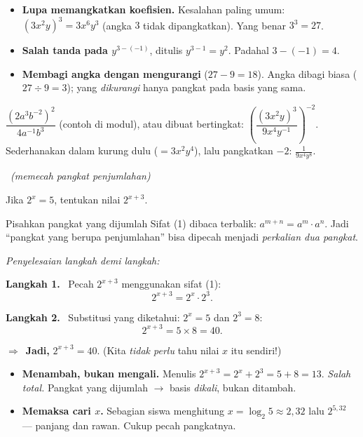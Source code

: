 \documentclass[11pt,a4paper]{report}
\theoremstyle{gaya}
\newcommand{\jawab}{\par\smallskip\noindent\textit{\textcolor{oranye}{Penyelesaian langkah demi langkah:}}\par\smallskip}
\newcommand{\langkah}[1]{\par\smallskip\noindent\textbf{\textcolor{biru}{Langkah #1.}}\ }
\newcommand{\jadi}{\par\smallskip\noindent$\Rightarrow$\ \textbf{Jadi, }}
\newcommand{\soalno}[2]{%
  \par\bigskip
  \noindent{\large\bfseries\color{ungu}\rule[-2pt]{4pt}{14pt}\ Soal #1}%
  \ {\normalfont\itshape\color{gray}(#2)}\par\nopagebreak\smallskip}
\begin{document}
\begin{jebakan}
\begin{itemize}[leftmargin=*,topsep=2pt]
  \item \textbf{Lupa memangkatkan koefisien.} Kesalahan paling umum:
  $(3x^2y)^3 = 3x^6y^3$ (angka $3$ tidak dipangkatkan). Yang benar $3^3=27$.
  \item \textbf{Salah tanda pada $y^{3-(-1)}$}, ditulis $y^{3-1}=y^2$. Padahal
  $3-(-1)=4$.
  \item \textbf{Membagi angka dengan mengurangi} ($27-9=18$). Angka dibagi biasa
  ($27\div9=3$); yang \emph{dikurangi} hanya pangkat pada basis yang sama.
\end{itemize}
\end{jebakan}

\begin{variasi}
$\dfrac{(2a^3b^{-2})^2}{4a^{-1}b^3}$ (contoh di modul), atau dibuat
bertingkat: $\left(\dfrac{(3x^2y)^3}{9x^4y^{-1}}\right)^{-2}$. Sederhanakan
dalam kurung dulu ($=3x^2y^4$), lalu pangkatkan $-2$: $\frac{1}{9x^4y^8}$.
\end{variasi}

\soalno{1.1.5}{memecah pangkat penjumlahan}
\begin{soalbox}{}
Jika $2^x = 5$, tentukan nilai $2^{x+3}$.
\end{soalbox}

\begin{ingat}{Pisahkan pangkat yang dijumlah}
Sifat (1) dibaca terbalik: $a^{m+n} = a^m\cdot a^n$. Jadi ``pangkat yang berupa
penjumlahan'' bisa dipecah menjadi \emph{perkalian dua pangkat}.
\end{ingat}

\jawab
\langkah{1} Pecah $2^{x+3}$ menggunakan sifat (1):
\[
2^{x+3} = 2^{x}\cdot 2^{3}.
\]
\langkah{2} Substitusi yang diketahui: $2^x = 5$ dan $2^3=8$:
\[
2^{x+3} = 5\times 8 = 40.
\]
\jadi $2^{x+3} = 40$. (Kita \emph{tidak perlu} tahu nilai $x$ itu sendiri!)

\begin{jebakan}
\begin{itemize}[leftmargin=*,topsep=2pt]
  \item \textbf{Menambah, bukan mengali.} Menulis $2^{x+3}=2^x + 2^3 = 5+8=13$.
  \emph{Salah total.} Pangkat yang dijumlah $\to$ basis \emph{dikali}, bukan
  ditambah.
  \item \textbf{Memaksa cari $x$.} Sebagian siswa menghitung $x=\log_2 5\approx2{,}32$
  lalu $2^{5{,}32}$ --- panjang dan rawan. Cukup pecah pangkatnya.
\end{itemize}
\end{jebakan}
\end{document}
